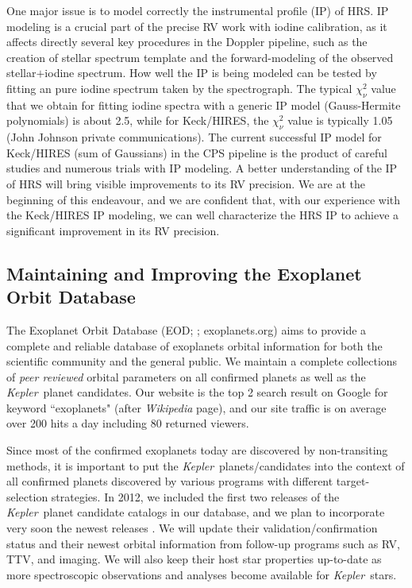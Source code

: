 \documentclass[12pt]{article}
\def\kepler{{\it Kepler}}
\begin{document}
One major issue is to model correctly the instrumental profile (IP) of
HRS. IP modeling is a crucial part of the precise RV work with iodine
calibration, as it affects directly several key procedures in the
Doppler pipeline, such as the creation of stellar spectrum template
and the forward-modeling of the observed stellar$+$iodine
spectrum. How well the IP is being modeled can be tested by fitting an
pure iodine spectrum taken by the spectrograph. The typical
$\chi_\nu^2$ value that we obtain for fitting iodine spectra with a
generic IP model (Gauss-Hermite polynomials) is about 2.5, while for
Keck/HIRES, the $\chi_\nu^2$ value is typically 1.05 (John Johnson
private communications). The current successful IP model for
Keck/HIRES (sum of Gaussians) in the CPS pipeline is the product of
careful studies and numerous trials with IP modeling.  A better
understanding of the IP of HRS will bring visible improvements to its
RV precision. We are at the beginning of this endeavour, and we are
confident that, with our experience with the Keck/HIRES IP modeling,
we can well characterize the HRS IP to achieve a significant
improvement in its RV precision.


\vspace{-3pt}
\subsection{Maintaining and Improving the Exoplanet Orbit Database \label{database}}

The Exoplanet Orbit Database (EOD; \citealt{wright2011}; exoplanets.org)
aims to provide a complete and reliable database of exoplanets orbital
information for both the scientific community and the general
public. We maintain a complete collections of {\it peer reviewed} orbital
parameters on all confirmed planets as well as the \kepler\ planet
candidates. Our website is the top 2 search result on Google for
keyword ``exoplanets" (after {\it Wikipedia} page), and our site
traffic is on average over 200 hits a day including 80 returned
viewers.

Since most of the confirmed exoplanets today are discovered by
non-transiting methods, it is important to put the
\kepler\ planets/candidates into the context of all confirmed planets
discovered by various programs with different target-selection
strategies. In 2012, we included the first two releases of the
\kepler\ planet candidate catalogs in our database, and we plan to
incorporate very soon the newest releases \citep{batalha2013}. We will
update their validation/confirmation status and their newest orbital
information from follow-up programs such as RV, TTV, and imaging. We
will also keep their host star properties up-to-date as more
spectroscopic observations and analyses become available for
\kepler\ stars.
\end{document}
